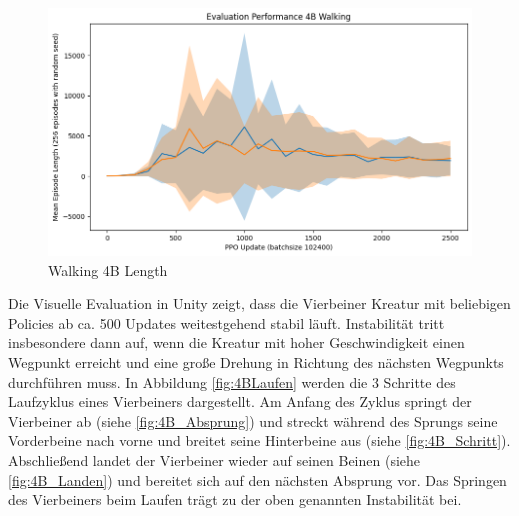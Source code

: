 \begin{figure}[ht]
    \centering
    \includegraphics[width=0.5\linewidth]{resources/img/results/Walking4B_Length.png}
    \caption{Walking 4B Length}\label{fig:Walking4B_Length}
\end{figure}

Die Visuelle Evaluation in Unity zeigt, dass die Vierbeiner Kreatur mit beliebigen Policies ab ca. 500 Updates weitestgehend stabil läuft. Instabilität tritt insbesondere dann auf, wenn die Kreatur mit hoher Geschwindigkeit einen Wegpunkt erreicht und eine große Drehung in Richtung des nächsten Wegpunkts durchführen muss.\newline
In Abbildung \ref{fig:4BLaufen} werden die 3 Schritte des Laufzyklus eines Vierbeiners dargestellt. Am Anfang des Zyklus springt der Vierbeiner ab (siehe \ref{fig:4B_Absprung}) und streckt während des Sprungs seine Vorderbeine nach vorne und breitet seine Hinterbeine aus (siehe \ref{fig:4B_Schritt}). Abschließend landet der Vierbeiner wieder auf seinen Beinen (siehe \ref{fig:4B_Landen}) und bereitet sich auf den nächsten Absprung vor. Das Springen des Vierbeiners beim Laufen trägt zu der oben genannten Instabilität bei.

